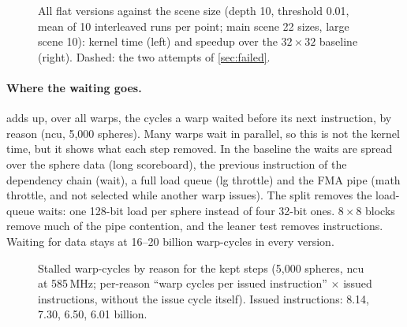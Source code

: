 \documentclass[11pt,a4paper]{article}
\newcommand{\stallbars}[1]{%
  \addplot[fill=blue!65,   draw=black!40] table[col sep=comma, x=long_scoreboard_gcycles,    y expr=\coordindex] {#1};
  \addplot[fill=cyan!45,   draw=black!40] table[col sep=comma, x=wait_gcycles,               y expr=\coordindex] {#1};
  \addplot[fill=orange!75, draw=black!40] table[col sep=comma, x=not_selected_gcycles,       y expr=\coordindex] {#1};
  \addplot[fill=red!65,    draw=black!40] table[col sep=comma, x=math_pipe_throttle_gcycles, y expr=\coordindex] {#1};
  \addplot[fill=violet!60, draw=black!40] table[col sep=comma, x=lg_throttle_gcycles,        y expr=\coordindex] {#1};
  \addplot[fill=teal!55,   draw=black!40] table[col sep=comma, x=branch_resolving_gcycles,   y expr=\coordindex] {#1};
  \addplot[fill=brown!50,  draw=black!40] table[col sep=comma, x=no_instruction_gcycles,     y expr=\coordindex] {#1};
  \addplot[fill=gray!30,   draw=black!40] table[col sep=comma, x=other_gcycles,              y expr=\coordindex] {#1};
  \legend{data (long scoreboard), dependency (wait), not selected, FMA pipe (math throttle),
          load queue (lg throttle), branch, instruction fetch, other}}
\begin{document}
\begin{figure}[h]
  \hfill
  \caption{All flat versions against the scene size (depth 10, threshold 0.01, mean of 10 interleaved
    runs per point; main scene 22 sizes, large scene 10): kernel time (left) and speedup over the
    $32 \times 32$ baseline (right). Dashed: the two attempts of \cref{sec:failed}.}
  \label{fig:sweep}
\end{figure}

\paragraph{Where the waiting goes.}  adds up, over all warps, the cycles a warp
waited before its next instruction, by reason (ncu, 5,000 spheres). Many warps wait in parallel, so
this is not the kernel time, but it shows what each step removed. In the baseline the waits are spread
over the sphere data (long scoreboard), the previous instruction of the dependency chain (wait), a
full load queue (lg throttle) and the FMA pipe (math throttle, and not selected while another warp
issues). The split removes the load-queue waits: one 128-bit load per sphere instead of four 32-bit
ones. $8 \times 8$ blocks remove much of the pipe contention, and the leaner test removes
instructions. Waiting for data stays at 16--20 billion warp-cycles in every version.

\begin{figure}[h]
  \centering
  \caption{Stalled warp-cycles by reason for the kept steps (5,000 spheres, ncu at 585\,MHz;
    per-reason ``warp cycles per issued instruction'' $\times$ issued instructions, without the
    issue cycle itself). Issued instructions: 8.14, 7.30, 6.50, 6.01 billion.}
  \label{fig:stalls}
\end{figure}
\end{document}
